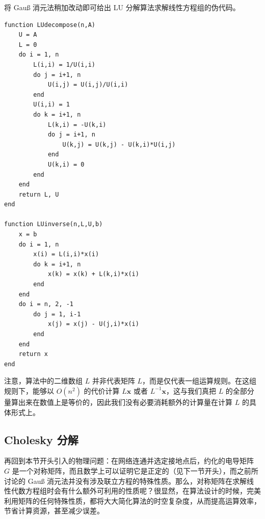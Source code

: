 将 Gauß 消元法稍加改动即可给出 LU 分解算法求解线性方程组的伪代码。

\begin{algorithmBox}[算法 3.2\quad LU 分解]
\begin{lstlisting}[style=bellacode]
function LUdecompose(n,A)
    U = A
    L = 0
    do i = 1, n
        L(i,i) = 1/U(i,i)
        do j = i+1, n
            U(i,j) = U(i,j)/U(i,i)
        end
        U(i,i) = 1
        do k = i+1, n
            L(k,i) = -U(k,i)
            do j = i+1, n
                U(k,j) = U(k,j) - U(k,i)*U(i,j)
            end
            U(k,i) = 0
        end
    end
    return L, U
end

function LUinverse(n,L,U,b)
    x = b
    do i = 1, n
        x(i) = L(i,i)*x(i)
        do k = i+1, n
            x(k) = x(k) + L(k,i)*x(i)
        end
    end
    do i = n, 2, -1
        do j = 1, i-1
            x(j) = x(j) - U(j,i)*x(i)
        end
    end
    return x
end
\end{lstlisting}
\end{algorithmBox}

注意，算法中的二维数组 $L$ 并非代表矩阵 $L$，而是仅代表一组运算规则。在这组规则下，能够以 $O(n^2)$ 的代价计算 $L\bm x$ 或者 $L^{-1}\bm x$，这与我们真把 $L$ 的全部分量算出来在数值上是等价的，因此我们没有必要消耗额外的计算量在计算 $L$ 的具体形式上。

\subsection{Cholesky 分解}

再回到本节开头引入的物理问题：在网络连通并选定接地点后，约化的电导矩阵 $G$ 是一个对称矩阵，而且数学上可以证明它是正定的（见下一节开头），而之前所讨论的 Gauß 消元法并没有涉及联立方程的特殊性质。那么，对称矩阵在求解线性代数方程组时会有什么额外可利用的性质呢？很显然，在算法设计的时候，完美利用矩阵的任何特殊性质，都将大大简化算法的时空复杂度，从而提高运算效率，节省计算资源，甚至减少误差。

